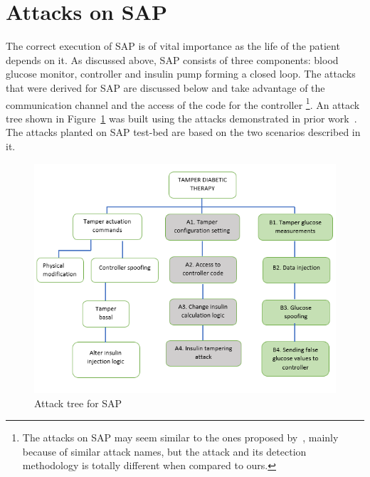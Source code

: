 \section{Attacks on SAP}
The correct execution of SAP is of vital importance as the life of the patient depends on it. As discussed above, SAP consists of three components: blood glucose monitor, controller and insulin pump forming a closed loop. The attacks that were derived for SAP are discussed below and take advantage of the communication channel and the access of the code for the controller \footnote{The attacks on SAP may seem similar to the ones proposed by~\cite{aliabadi2017artinali}, mainly because of similar attack names, but the attack and its detection methodology is totally different when compared to ours.}. An attack tree shown in Figure~\ref{fig:attackTreeOpenAPS} was built using the attacks demonstrated in prior work~\cite{aliabadi2017artinali, radcliffe2011hacking}. The attacks planted on SAP test-bed are based on the two scenarios described in it.
\begin{figure}[ht]
    \centering
    \includegraphics[scale=0.55,keepaspectratio = true]{Graphics/AttackTreeSAPNew.png}
    \caption{Attack tree for SAP}
    \label{fig:attackTreeOpenAPS}
\end{figure}

